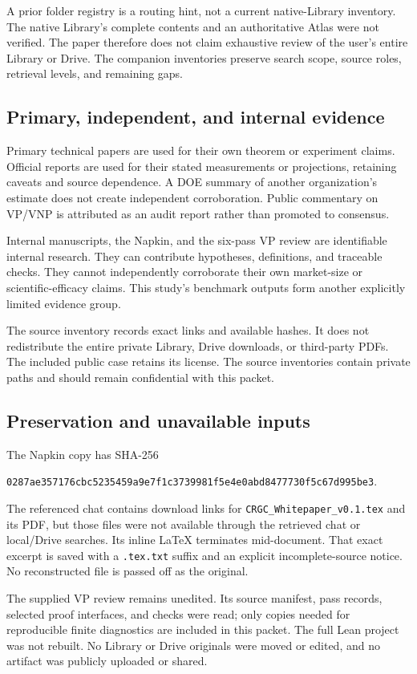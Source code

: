\documentclass[11pt,letterpaper]{article}
\begin{document}
A prior folder registry is a routing hint, not a current native-Library inventory. The native Library's complete contents and an authoritative Atlas were not verified. The paper therefore does not claim exhaustive review of the user's entire Library or Drive. The companion inventories preserve search scope, source roles, retrieval levels, and remaining gaps.

\subsection{Primary, independent, and internal evidence}
Primary technical papers are used for their own theorem or experiment claims. Official reports are used for their stated measurements or projections, retaining caveats and source dependence. A DOE summary of another organization's estimate does not create independent corroboration. Public commentary on VP/VNP is attributed as an audit report rather than promoted to consensus.

Internal manuscripts, the Napkin, and the six-pass VP review are identifiable internal research. They can contribute hypotheses, definitions, and traceable checks. They cannot independently corroborate their own market-size or scientific-efficacy claims. This study's benchmark outputs form another explicitly limited evidence group.

The source inventory records exact links and available hashes. It does not redistribute the entire private Library, Drive downloads, or third-party PDFs. The included public case retains its license. The source inventories contain private paths and should remain confidential with this packet.

\subsection{Preservation and unavailable inputs}
The Napkin copy has SHA-256
\begin{center}\small\texttt{0287ae357176cbc5235459a9e7f1c3739981f5e4e0abd8477730f5c67d995be3}.\end{center}
The referenced chat contains download links for \texttt{CRGC\_Whitepaper\_v0.1.tex} and its PDF, but those files were not available through the retrieved chat or local/Drive searches. Its inline LaTeX terminates mid-document. That exact excerpt is saved with a \texttt{.tex.txt} suffix and an explicit incomplete-source notice. No reconstructed file is passed off as the original.

The supplied VP review remains unedited. Its source manifest, pass records, selected proof interfaces, and checks were read; only copies needed for reproducible finite diagnostics are included in this packet. The full Lean project was not rebuilt. No Library or Drive originals were moved or edited, and no artifact was publicly uploaded or shared.
\end{document}
